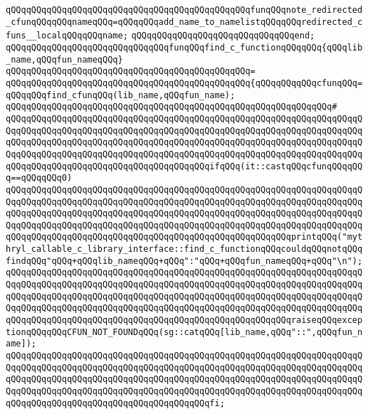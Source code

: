 \verb|qQQqqQQqqQQqqQQqqQQqqQQqqQQqqQQqqQQqqQQqqQQqqQQqfunqQQqnote_redirected_cfunqQQqqQQqnameqQQq=qQQqqQQqadd_name_to_namelistqQQqqQQqredirected_cfuns__localqQQqqQQqname;|\newline
\verb|qQQqqQQqqQQqqQQqqQQqqQQqqQQqqQQqend;|\newline
\newline
\verb|qQQqqQQqqQQqqQQqqQQqqQQqqQQqqQQqfunqQQqfind_c_functionqQQqqQQq{qQQqlib_name,qQQqfun_nameqQQq}|\newline
\verb|qQQqqQQqqQQqqQQqqQQqqQQqqQQqqQQqqQQqqQQqqQQqqQQq=|\newline
\verb|qQQqqQQqqQQqqQQqqQQqqQQqqQQqqQQqqQQqqQQqqQQqqQQq{qQQqqQQqqQQqcfunqQQq=qQQqqQQqfind_cfunqQQq(lib_name,qQQqfun_name);|\newline
\verb|qQQqqQQqqQQqqQQqqQQqqQQqqQQqqQQqqQQqqQQqqQQqqQQqqQQqqQQqqQQqqQQq#|\newline
\verb|qQQqqQQqqQQqqQQqqQQqqQQqqQQqqQQqqQQqqQQqqQQqqQQqqQQqqQQqqQQqqQQqqQQqqQQqqQQqqQQqqQQqqQQqqQQqqQQqqQQqqQQqqQQqqQQqqQQqqQQqqQQqqQQqqQQqqQQqqQQqqQQqqQQqqQQqqQQqqQQqqQQqqQQqqQQqqQQqqQQqqQQqqQQqqQQqqQQqqQQqqQQqqQQqqQQqqQQqqQQqqQQqqQQqqQQqqQQqqQQqqQQqqQQqqQQqqQQqqQQqqQQqqQQqqQQqqQQqqQQqqQQqqQQqqQQqqQQqqQQqqQQqqQQqqQQqqQQqqQQqifqQQq(it::castqQQqcfunqQQqqQQq==qQQqqQQq0)|\newline
\verb|qQQqqQQqqQQqqQQqqQQqqQQqqQQqqQQqqQQqqQQqqQQqqQQqqQQqqQQqqQQqqQQqqQQqqQQqqQQqqQQqqQQqqQQqqQQqqQQqqQQqqQQqqQQqqQQqqQQqqQQqqQQqqQQqqQQqqQQqqQQqqQQqqQQqqQQqqQQqqQQqqQQqqQQqqQQqqQQqqQQqqQQqqQQqqQQqqQQqqQQqqQQqqQQqqQQqqQQqqQQqqQQqqQQqqQQqqQQqqQQqqQQqqQQqqQQqqQQqqQQqqQQqqQQqqQQqqQQqqQQqqQQqqQQqqQQqqQQqqQQqqQQqqQQqqQQqqQQqqQQqqQQqqQQqqQQqqQQqprintqQQq("mythryl_callable_c_library_interface::find_c_functionqQQqcouldqQQqnotqQQqfindqQQq"qQQq+qQQqlib_nameqQQq+qQQq":"qQQq+qQQqfun_nameqQQq+qQQq"\n");|\newline
\verb|qQQqqQQqqQQqqQQqqQQqqQQqqQQqqQQqqQQqqQQqqQQqqQQqqQQqqQQqqQQqqQQqqQQqqQQqqQQqqQQqqQQqqQQqqQQqqQQqqQQqqQQqqQQqqQQqqQQqqQQqqQQqqQQqqQQqqQQqqQQqqQQqqQQqqQQqqQQqqQQqqQQqqQQqqQQqqQQqqQQqqQQqqQQqqQQqqQQqqQQqqQQqqQQqqQQqqQQqqQQqqQQqqQQqqQQqqQQqqQQqqQQqqQQqqQQqqQQqqQQqqQQqqQQqqQQqqQQqqQQqqQQqqQQqqQQqqQQqqQQqqQQqqQQqqQQqqQQqqQQqqQQqqQQqqQQqqQQqraiseqQQqexceptionqQQqqQQqCFUN_NOT_FOUNDqQQq(sg::catqQQq[lib_name,qQQq"::",qQQqfun_name]);|\newline
\verb|qQQqqQQqqQQqqQQqqQQqqQQqqQQqqQQqqQQqqQQqqQQqqQQqqQQqqQQqqQQqqQQqqQQqqQQqqQQqqQQqqQQqqQQqqQQqqQQqqQQqqQQqqQQqqQQqqQQqqQQqqQQqqQQqqQQqqQQqqQQqqQQqqQQqqQQqqQQqqQQqqQQqqQQqqQQqqQQqqQQqqQQqqQQqqQQqqQQqqQQqqQQqqQQqqQQqqQQqqQQqqQQqqQQqqQQqqQQqqQQqqQQqqQQqqQQqqQQqqQQqqQQqqQQqqQQqqQQqqQQqqQQqqQQqqQQqqQQqqQQqqQQqqQQqqQQqqQQqqQQqfi;|\newline

